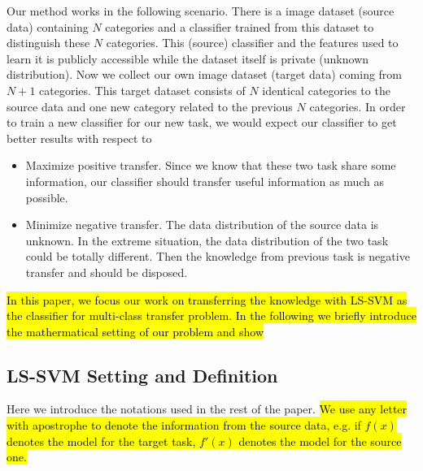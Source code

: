 Our method works in the following scenario. There is a image dataset (source data) containing $N$ categories and a classifier trained from this dataset to distinguish these $N$ categories. This (source) classifier and the features used to learn it is publicly accessible while the dataset itself is private (unknown distribution).  Now we collect our own image dataset (target data) coming from $N+1$ categories. This target dataset consists of $N$ identical categories to the source data and one new category related to the previous $N$ categories. In order to train a new classifier for our new task, we would expect our classifier to get better results with respect to 
\begin{itemize}
\item Maximize positive transfer. Since we know that these two task share some information, our classifier should transfer useful information as much as possible.
\item Minimize negative transfer. The data distribution of the source data is unknown. In the extreme situation, the data distribution of the two task could be totally different. Then the knowledge from previous task is negative transfer and should be disposed.
\end{itemize}

\hl{In this paper, we focus our work on transferring the knowledge with LS-SVM as the classifier for multi-class transfer problem. In the following we briefly introduce the mathermatical setting of our problem and show   }

\subsection{LS-SVM Setting and Definition}
Here we introduce the notations used in the rest of the paper. \hl{We use any letter with apostrophe to denote the information from the source data, e.g. if $f(x)$ denotes the model for the target task, $f'(x)$ denotes the model for the source one.}

